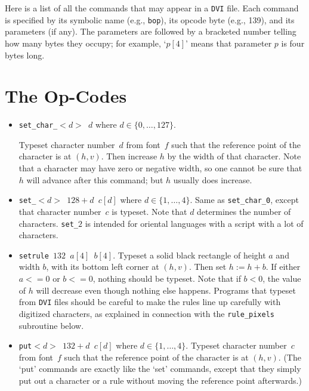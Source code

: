 \documentclass[10pt, a4paper, english]{article}
\begin{document}
Here is a list of all the commands that may appear in a \texttt{DVI} file. 
Each command is specified by its symbolic name (e.g., \texttt{bop}), 
its opcode byte (e.g., 139), and its parameters (if any). 
The parameters are followed by a bracketed number 
telling how many bytes they occupy; for example,
`$p[4]$' means that parameter $p$ is four bytes long. 

\section{The Op-Codes}\label{sec:opCodes}

\begin{itemize}

\item[0--127] \texttt{set\_char\_$<d>$ $d$} where $d\in\{0,\dots,127\}$. 

Typeset character number~$d$ from font~$f$ 
such that the reference point of the character is at $(h,v)$. 
Then increase $h$ by the width of that character. 
Note that a character may have zero or negative width, 
so one cannot be sure that $h$ will advance after this command; 
but $h$ usually does increase.

\item[128--131] \texttt{set\_$<d>$ $128+d$ $c[d]$} where $d\in\{1,\dots,4\}$. 
Same as \texttt{set\_char\_0}, except that character number~$c$ is typeset. 
Note that $d$ determines the number of characters. 
\texttt{set\_$2$} is intended for oriental languages 
with a script with a lot of characters. 


\item[132] \texttt{setrule $132$ $a[4]$ $b[4]$}. 
Typeset a solid black rectangle of height $a$ and width $b$, 
with its bottom left corner at $(h,v)$. 
Then set $h:=h+b$. If either $a<=0$ or $b<=0$, nothing should be typeset. 
Note that if $b<0$, the value of $h$ will decrease 
even though nothing else happens. 
Programs that typeset from \texttt{DVI} files 
should be careful to make the rules line up carefully 
with digitized characters, 
as explained in connection with the \texttt{rule\_pixels} subroutine below.

\item[137] \texttt{put$<d>$ $132+d$ $c[d]$} where $d\in\{1,\dots,4\}$. 
Typeset character number~$c$ from font~$f$
such that the reference point of the character is at $(h,v)$. 
(The `put' commands are exactly like the `set' commands, 
except that they simply put out a character or a rule 
without moving the reference point afterwards.)



\end{itemize}
\end{document}
